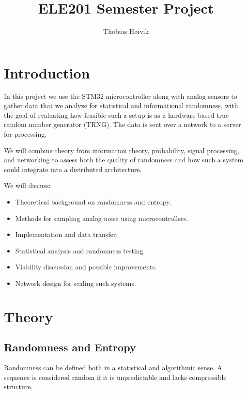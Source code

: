 

\title{\huge{ELE201 Semester Project}}
\author{\LARGE{Thobias Høivik}}
\date{}


\maketitle

\newpage
\tableofcontents

\newpage
\section{Introduction}
In this project we use the STM32 microcontroller along with analog 
sensors 
to gather data that we analyze for statistical and informational 
randomness, 
with the goal of evaluating how feasible such a setup is as a 
hardware-based true random number generator (TRNG). 
The data is sent over 
a network to a server for processing.

We will combine theory from information theory, probability, 
signal processing, and networking to assess both the quality of 
randomness 
and how such a system could integrate into a distributed architecture.

We will discuss:
\begin{itemize}
    \item Theoretical background on randomness and entropy.
    \item Methods for sampling analog noise using microcontrollers.
    \item Implementation and data transfer.
    \item Statistical analysis and randomness testing.
    \item Viability discussion and possible improvements.
    \item Network design for scaling such systems.
\end{itemize}

\newpage
\section{Theory}
\subsection{Randomness and Entropy}
Randomness can be defined both in a statistical and algorithmic sense. 
A sequence is considered random if it is unpredictable and lacks 
compressible structure.

